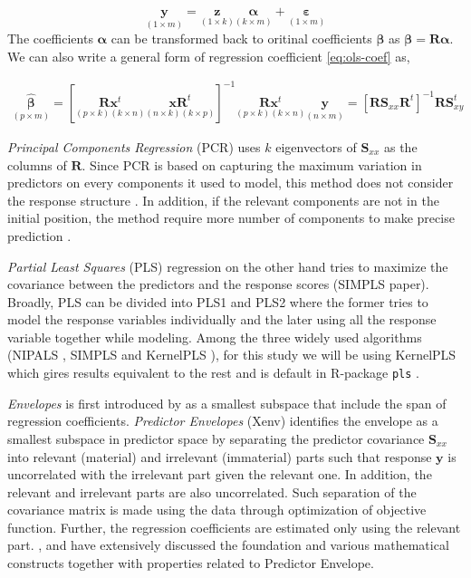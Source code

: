 \documentclass[12pt,3p,authoryear]{elsarticle}
\begin{document}
\begin{equation}
\underset{(1 \times m)}{\mathbf{y}} =
  \underset{(1 \times k)}{\mathbf{z}}
    \underset{(k \times m)}{\boldsymbol{\alpha}} +
  \underset{(1 \times m)}{\boldsymbol{\varepsilon}}
\label{eq:latent-model}
\end{equation}
The coefficients \(\boldsymbol{\alpha}\) can be transformed back to oritinal coefficients \(\boldsymbol{\beta}\) as \(\boldsymbol{\beta} = \mathbf{R} \boldsymbol{\alpha}\). We can also write a general form of regression coefficient \eqref{eq:ols-coef} as,

\[
\begin{aligned}
\underset{(p\times m)}{\boldsymbol{\hat{\beta}}} =
  \left[
    \underset{(p\times k)(k \times n)}{\mathbf{R}\mathbf{x}^t}
    \underset{(n\times k)(k \times p)}{\mathbf{x} \mathbf{R}^t}
  \right]^{-1}
  \underset{(p\times k)(k \times n)}{\mathbf{R}\mathbf{x}^t}
  \underset{(n\times m)}{\mathbf{y}} =
  \left[\mathbf{RS}_{xx}\mathbf{R}^t\right]^{-1}\mathbf{RS}_{xy}^t
\end{aligned}
\]

\emph{Principal Components Regression} (PCR) uses \(k\) eigenvectors of \(\mathbf{S}_{xx}\) as the columns of \(\mathbf{R}\). Since PCR is based on capturing the maximum variation in predictors on every components it used to model, this method does not consider the response structure \citep{Jolliffe2002}. In addition, if the relevant components are not in the initial position, the method require more number of components to make precise prediction \citep{rimal2019pred}.

\emph{Partial Least Squares} (PLS) regression on the other hand tries to maximize the covariance between the predictors and the response scores (SIMPLS paper). Broadly, PLS can be divided into PLS1 and PLS2 where the former tries to model the response variables individually and the later using all the response variable together while modeling. Among the three widely used algorithms (NIPALS \citep{wold75nipals}, SIMPLS \citep{DeJong1993} and KernelPLS \citep{Lindgren_1993}), for this study we will be using KernelPLS which gires results equivalent to the rest and is default in R-package \texttt{pls} \citep{mevik07_thepl}.

\emph{Envelopes} is first introduced by \citep{Cook2007a} as a smallest subspace that include the span of regression coefficients. \emph{Predictor Envelopes} (Xenv) identifies the envelope as a smallest subspace in predictor space by separating the predictor covariance \(\mathbf{S}_{xx}\) into relevant (material) and irrelevant (immaterial) parts such that response \(\mathbf{y}\) is uncorrelated with the irrelevant part given the relevant one. In addition, the relevant and irrelevant parts are also uncorrelated. Such separation of the covariance matrix is made using the data through optimization of objective function. Further, the regression coefficients are estimated only using the relevant part. \citet{cook2010envelope}, \citet{cook2013envelopes} and \citet{cook2018envelope} have extensively discussed the foundation and various mathematical constructs together with properties related to Predictor Envelope.
\end{document}
